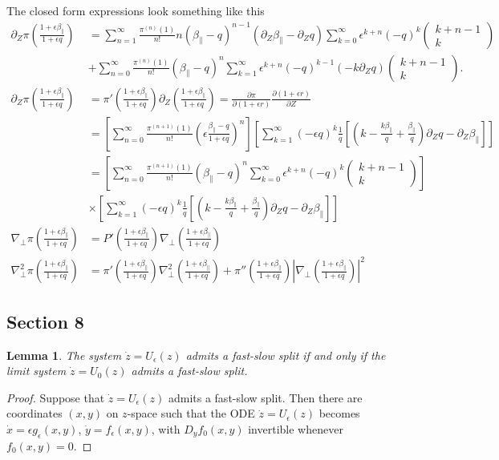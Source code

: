 \documentclass{article}
\newtheorem{lemma}{Lemma}
\newcommand{\para}{\parallel}
\newcommand{\ep}{\epsilon}
\newcommand{\np}{\nabla_\perp}
\newcommand{\p}{\partial}
\newcommand{\deriv}[2]{\frac{\p #1}{\p #2}}
\newcommand{\frinv}{\frac{1+\ep\beta_\para}{1+\ep q}}
\newcommand{\pth} [1] {\left( #1 \right) }
\newcommand{\br} [1] {\left[ #1 \right] }
\newcommand{\pmat} [1] {\begin{pmatrix} #1 \end{pmatrix}}
\begin{document}
The closed form expressions look something like this
\begin{align*}
    \p_Z\pi\pth{\frinv} &= \sum_{n=1}^\infty \frac{\pi^{(n)}(1)}{n!} n\pth{\beta_\para-q}^{n-1} \pth{\p_Z\beta_\para-\p_Zq} 
    \sum_{k=0}^\infty \ep^{k+n} \pth{-q}^k \pmat{k+n-1 \\ k} \\ 
        &+ \sum_{n=0}^\infty \frac{\pi^{(n)}(1)}{n!} \pth{\beta_\para-q}^n 
        \sum_{k=1}^\infty \ep^{k+n} \pth{-q}^{k-1} \pth{-k\p_Zq} \pmat{k+n-1 \\ k}. \\ 
    \p_Z\pi\pth{\frinv} &= \pi'\pth{\frinv} \p_Z\pth{\frinv} = \deriv{\pi}{(1+\ep r)} \deriv{(1+\ep r)}{Z} \\ 
        &= \br{ \sum_{n=0}^\infty \frac{\pi^{(n+1)}(1)}{n!} \pth{\ep\frac{\beta_\para-q}{1+\ep q}}^n} 
        \br{\sum_{k=1}^\infty \pth{-\ep q}^k \frac{1}{q} \br{\pth{k - \frac{k\beta_\para}{q} + \frac{\beta_\para}{q}} \p_Zq - \p_Z \beta_\para }} \\ 
        &= \br{ \sum_{n=0}^\infty \frac{\pi^{(n+1)}(1)}{n!} \pth{\beta_\para-q}^n \sum_{k=0}^\infty \ep^{k+n} \pth{-q}^k \pmat{k+n-1 \\ k}} \\ 
        &\times \br{\sum_{k=1}^\infty \pth{-\ep q}^k \frac{1}{q} \br{\pth{k - \frac{k\beta_\para}{q} + \frac{\beta_\para}{q}} \p_Zq - \p_Z \beta_\para }} \\ 
    \np\pi\pth{\frinv} &= P'\pth{\frinv} \np\pth{\frinv} \\ 
    \np^2\pi\pth{\frinv} &= \pi'\pth{\frinv}\np^2\pth{\frinv} + \pi''\pth{\frinv} \left| \np\pth{\frinv} \right|^2 
\end{align*}



\subsection{Section 8}
\begin{lemma} \label{limitsystem}
The system $\dot{z} = U_\epsilon(z)$ admits a fast-slow split if and only if the limit system $\dot{z} = U_0(z)$ admits a fast-slow split.
\end{lemma}
\begin{proof}
Suppose that $\dot{z} = U_\ep(z)$ admits a fast-slow split. Then there are coordinates $(x,y)$ on $z$-space such that the ODE $\dot{z} = U_\ep(z)$ becomes $\dot{x} = \ep g_\ep(x,y)$, $\dot{y} = f_\ep(x,y)$, with $D_yf_0(x,y)$ invertible whenever $f_0(x,y) = 0$.
\end{proof}
\end{document}
